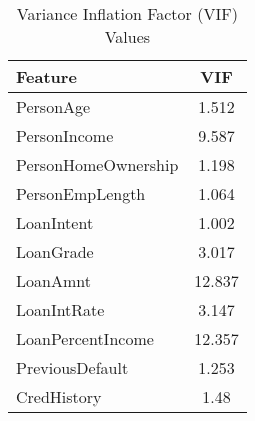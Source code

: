 \begin{table}[H]\centering
\caption{Variance Inflation Factor (VIF) Values}
\label{Table 4:vif_values}
\begin{tabular}{lc}
\toprule
Feature & VIF \\
\midrule
PersonAge & 1.512 \\
PersonIncome & 9.587 \\
PersonHomeOwnership & 1.198 \\
PersonEmpLength & 1.064 \\
LoanIntent & 1.002 \\
LoanGrade & 3.017 \\
LoanAmnt & 12.837 \\
LoanIntRate & 3.147 \\
LoanPercentIncome & 12.357 \\
PreviousDefault & 1.253 \\
CredHistory & 1.48 \\
\bottomrule
\end{tabular}
\end{table}
